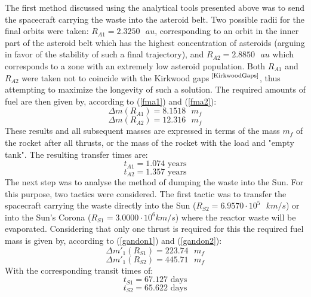 \documentclass[onecolumn,12pt]{article}
\numberwithin{equation}{section}
\begin{document}
The first method discussed using the analytical tools presented above was to send the spacecraft carrying the waste into the asteroid belt. Two possible radii for the final orbits were taken: $R_{A1} = 2.3250 \text{ }au$, corresponding to an orbit in the inner part of the asteroid belt which has the highest concentration of asteroids (arguing in favor of the stability of such a final trajectory), and $R_{A2} = 2.8850 \text{ }au$ which corresponds to a zone with an extremely low asteroid population. Both $R_{A1}$ and $R_{A2}$ were taken not to coincide with the Kirkwood gaps$^{\text{ \cite{KirkwoodGaps}}} $, thus attempting to maximize the longevity of such a solution. The required amounts of fuel are then given by, according to (\ref{fma1}) and (\ref{fma2}):
\begin{equation*}
    \Delta m (R_{A1}) =  8.1518 \text{ }m_f
\end{equation*}
\begin{equation*}
    \Delta m (R_{A2}) =  12.316 \text{ }m_f
\end{equation*}
These results and all subsequent masses are expressed in terms of the mass $m_f$ of the rocket after all thrusts, or the mass of the rocket with the load and "empty tank". The resulting transfer times are:
\begin{equation*}
    t_{A1} = 1.074 \text{ years}
\end{equation*}
\begin{equation*}
    t_{A2} = 1.357 \text{ years}
\end{equation*}
The next step was to analyse the method of dumping the waste into the Sun. For this purpose, two tactics were considered. The first tactic was to transfer the spacecraft carrying the waste directly into the Sun ($R_{S2} = 6.9570 \cdot 10^5 \text{ }km/s$) or into the Sun's Corona ($R_{S1} = 3.0000 \cdot 10^6 km/s$) where the reactor waste will be evaporated. Considering that only one thrust is required for this the required fuel mass is given by, according to (\ref{gandon1}) and (\ref{gandon2}):
\begin{equation*}
    \Delta m'_1 (R_{S1}) = 223.74 \text{ }m_f
\end{equation*}
\begin{equation*}
    \Delta m'_1 (R_{S2}) = 445.71 \text{ }m_f
\end{equation*}
With the corresponding transit times of:
\begin{equation*}
    t_{S1} = 67.127 \text{ days}
\end{equation*}
\begin{equation*}
    t_{S2} = 65.622 \text{ days}
\end{equation*}
\end{document}

